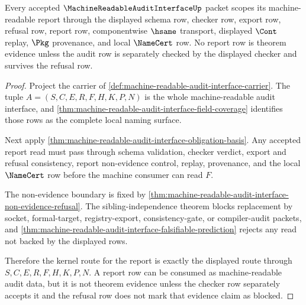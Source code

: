 \begin{theorem}
\label{thm:machine-readable-audit-interface-kernel-scope}
Every accepted $\MachineReadableAuditInterfaceUp$ packet scopes its machine-readable report through the displayed schema row, checker row, export row, refusal row, report row, componentwise $\hsame$ transport, displayed $\Cont$ replay, $\Pkg$ provenance, and local $\NameCert$ row. No report row is theorem evidence unless the audit row is separately checked by the displayed checker and survives the refusal row.
\end{theorem}
\begin{proof}
Project the carrier of \autoref{def:machine-readable-audit-interface-carrier}. The tuple $A=(S,C,E,R,F,H,K,P,N)$ is the whole machine-readable audit interface, and \autoref{thm:machine-readable-audit-interface-field-coverage} identifies those rows as the complete local naming surface.

Next apply \autoref{thm:machine-readable-audit-interface-obligation-basis}. Any accepted report read must pass through schema validation, checker verdict, export and refusal consistency, report non-evidence control, replay, provenance, and the local $\NameCert$ row before the machine consumer can read $F$.

The non-evidence boundary is fixed by \autoref{thm:machine-readable-audit-interface-non-evidence-refusal}. The sibling-independence theorem blocks replacement by socket, formal-target, registry-export, consistency-gate, or compiler-audit packets, and \autoref{thm:machine-readable-audit-interface-falsifiable-prediction} rejects any read not backed by the displayed rows.

Therefore the kernel route for the report is exactly the displayed route through $S,C,E,R,F,H,K,P,N$. A report row can be consumed as machine-readable audit data, but it is not theorem evidence unless the checker row separately accepts it and the refusal row does not mark that evidence claim as blocked.
\end{proof}

